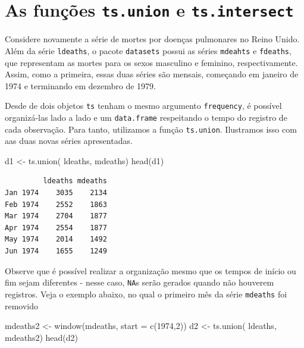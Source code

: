 \documentclass[
  letterpaper,
  DIV=11,
  numbers=noendperiod]{scrartcl}
\newenvironment{Shaded}{\begin{snugshade}}{\end{snugshade}}
\newcommand{\AttributeTok}[1]{\textcolor[rgb]{0.40,0.45,0.13}{#1}}
\newcommand{\DecValTok}[1]{\textcolor[rgb]{0.68,0.00,0.00}{#1}}
\newcommand{\FunctionTok}[1]{\textcolor[rgb]{0.28,0.35,0.67}{#1}}
\newcommand{\NormalTok}[1]{\textcolor[rgb]{0.00,0.23,0.31}{#1}}
\newcommand{\OtherTok}[1]{\textcolor[rgb]{0.00,0.23,0.31}{#1}}
\theoremstyle{definition}
\theoremstyle{definition}
\theoremstyle{plain}
\theoremstyle{plain}
\theoremstyle{remark}
\begin{document}
\section{\texorpdfstring{As funções \texttt{ts.union} e
\texttt{ts.intersect}}{As funções ts.union e ts.intersect}}\label{as-funuxe7uxf5es-ts.union-e-ts.intersect}

Considere novamente a série de mortes por doenças pulmonares no Reino
Unido. Além da série \texttt{ldeaths}, o pacote \texttt{datasets} possui
as séries \texttt{mdeahts} e \texttt{fdeaths}, que representam as mortes
para os sexos masculino e feminino, respectivamente. Assim, como a
primeira, essas duas séries são mensais, começando em janeiro de 1974 e
terminando em dezembro de 1979.

Desde de dois objetos \texttt{ts} tenham o mesmo argumento
\texttt{frequency}, é possível organizá-las lado a lado e um
\texttt{data.frame} respeitando o tempo do registro de cada observação.
Para tanto, utilizamos a função \texttt{ts.union}. Ilustramos isso com
aas duas novas séries apresentadas.

\begin{Shaded}
\begin{Highlighting}[]
\NormalTok{d1 }\OtherTok{\textless{}{-}} \FunctionTok{ts.union}\NormalTok{( ldeaths, mdeaths)}
\FunctionTok{head}\NormalTok{(d1)}
\end{Highlighting}
\end{Shaded}

\begin{verbatim}
         ldeaths mdeaths
Jan 1974    3035    2134
Feb 1974    2552    1863
Mar 1974    2704    1877
Apr 1974    2554    1877
May 1974    2014    1492
Jun 1974    1655    1249
\end{verbatim}

Observe que é possível realizar a organização mesmo que os tempos de
início ou fim sejam diferentes - nesse caso, \texttt{NA}s serão gerados
quando não houverem registros. Veja o exemplo abaixo, no qual o primeiro
mês da série \texttt{mdeaths} foi removido

\begin{Shaded}
\begin{Highlighting}[]
\NormalTok{mdeaths2 }\OtherTok{\textless{}{-}} \FunctionTok{window}\NormalTok{(mdeaths, }\AttributeTok{start =} \FunctionTok{c}\NormalTok{(}\DecValTok{1974}\NormalTok{,}\DecValTok{2}\NormalTok{))}
\NormalTok{d2 }\OtherTok{\textless{}{-}} \FunctionTok{ts.union}\NormalTok{( ldeaths, mdeaths2)}
\FunctionTok{head}\NormalTok{(d2)}
\end{Highlighting}
\end{Shaded}
\end{document}
